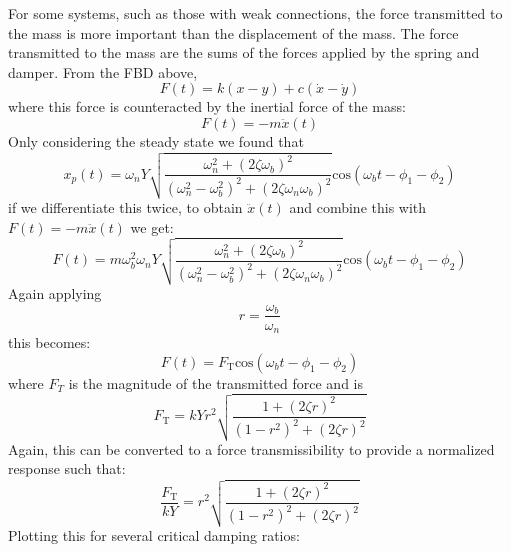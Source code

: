 \documentclass[12pt,letter]{article}
\numberwithin{ex}{section} %
\numberwithin{re}{section} %
\begin{document}
				For some systems, such as those with weak connections, the force transmitted to the mass is more important than the displacement of the mass. The force transmitted to the mass are the sums of the forces applied by the spring and damper. From the FBD above,
				\begin{equation}
				F(t) = k(x-y) + c(\dot{x} - \dot{y}) 
				\end{equation}
				where this force is counteracted by the inertial force of the mass:
				\begin{equation}
				F(t) = -m\ddot{x}(t)
				\end{equation}
				Only considering the steady state we found that 
				\begin{equation}
					x_p(t) = 	\omega_n Y   \sqrt{\frac{\omega_n^2 + (2 \zeta \omega_b)^2 }{(\omega_n^2 - \omega_b^2)^2 +  (2\zeta \omega_n \omega_b)^2} }  \text{cos}(\omega_bt - \phi_1 - \phi_2)
				\end{equation} 
				if we differentiate this twice, to obtain $\ddot{x}(t)$ and combine this with $F(t) = -m\ddot{x}(t)$ we get:
				\begin{equation}
					F(t) = 	m \omega_b^2 \omega_n Y   \sqrt{\frac{\omega_n^2 + (2 \zeta \omega_b)^2 }{(\omega_n^2 - \omega_b^2)^2 +  (2\zeta \omega_n \omega_b)^2} }  \text{cos}(\omega_bt - \phi_1 - \phi_2)
				\end{equation} 
				Again applying 
				\begin{equation}
					r=\frac{\omega_b}{\omega_n}
				\end{equation} 
				this becomes:
				\begin{equation}
					F(t) = 	F_\text{T} \text{cos}(\omega_bt - \phi_1 - \phi_2)
				\end{equation} 
				where $F_T$ is the magnitude of the transmitted force and is 
				\begin{equation}
					F_\text{T} = kYr^2 \sqrt{\frac{1+(2 \zeta r)^2}{(1-r^2)^2 + (2 \zeta r )^2}} 
				\end{equation}
				Again, this can be converted to a force transmissibility to provide a normalized response such that:
				\begin{equation}
					\frac{F_\text{T}}{kY} = r^2 \sqrt{\frac{1+(2 \zeta r)^2}{(1-r^2)^2 + (2 \zeta r )^2}} 
				\end{equation}
				Plotting this for several critical damping ratios:
\end{document}
